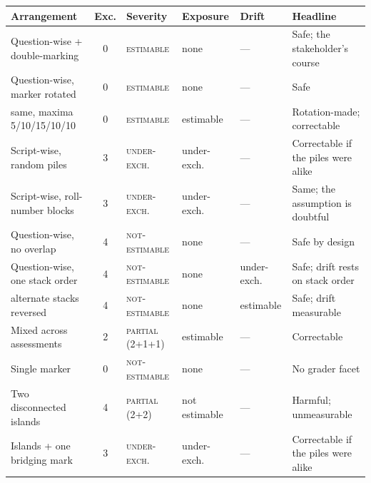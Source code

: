 \documentclass[10pt,a4paper]{article}
\begin{document}
\begin{center}\footnotesize
\setlength{\tabcolsep}{4.5pt}
\begin{tabular}{|l|c|l|l|l|p{4.5cm}|}
\hline
\textbf{Arrangement} & \textbf{Exc.} & \textbf{Severity} & \textbf{Exposure} & \textbf{Drift} & \textbf{Headline} \\
\hline
Question-wise + double-marking & 0 & \textsc{estimable} & none & --- & Safe; the stakeholder's course \\
Question-wise, marker rotated & 0 & \textsc{estimable} & none & --- & Safe \\
\quad same, maxima 5/10/15/10/10 & 0 & \textsc{estimable} & estimable & --- & Rotation-made; correctable \\
Script-wise, random piles & 3 & \textsc{under-exch.} & under-exch. & --- & Correctable if the piles were alike \\
Script-wise, roll-number blocks & 3 & \textsc{under-exch.} & under-exch. & --- & Same; the assumption is doubtful \\
Question-wise, no overlap & 4 & \textsc{not-estimable} & none & --- & Safe by design \\
Question-wise, one stack order & 4 & \textsc{not-estimable} & none & under-exch. & Safe; drift rests on stack order \\
\quad alternate stacks reversed & 4 & \textsc{not-estimable} & none & estimable & Safe; drift measurable \\
Mixed across assessments & 2 & \textsc{partial} (2+1+1) & estimable & --- & Correctable \\
Single marker & 0 & \textsc{not-estimable} & none & --- & No grader facet \\
Two disconnected islands & 4 & \textsc{partial} (2+2) & not estimable & --- & Harmful; unmeasurable \\
Islands + one bridging mark & 3 & \textsc{under-exch.} & under-exch. & --- & Correctable if the piles were alike \\
\hline
\end{tabular}
\end{center}
\end{document}
